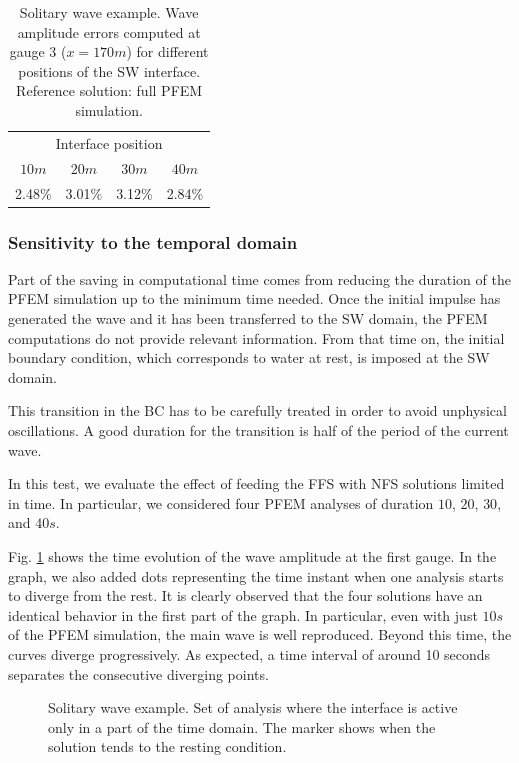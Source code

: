 \begin{table} [htb]
    \centering
    \begin{tabular}{cccc}
        \hline
\multicolumn{4}{c}{Interface position}  \\ \cline{1-4}
$10m$    & $20m$    & $30m$   & $40m$   \\ \hline
2.48\%   & 3.01\%   & 3.12\%  & 2.84\%  \\ \hline
    \end{tabular}
    \caption{Solitary wave example. Wave amplitude errors computed at gauge 3 ($x=170m$) for different positions of the SW interface. Reference solution: full PFEM simulation.}
    \label{solitary_wave_BC_errors_interface}
\end{table}


\subsubsection{Sensitivity to the temporal domain}
Part of the saving in computational time comes from reducing the duration of the PFEM simulation up to the minimum time needed. 
Once the initial impulse has generated the wave and it has been transferred to the SW domain, the PFEM computations do not provide relevant information. From that time on, the initial boundary condition, which corresponds to water at rest, is imposed at the SW domain.  

This transition in the BC has to be carefully treated in order to avoid unphysical oscillations. A good duration for the transition is half of the period of the current wave.

In this test, we evaluate the effect of feeding the FFS with NFS solutions limited in time. In particular, we considered four PFEM analyses of duration $10$, $20$, $30$, and $40s$.

Fig. \ref{solitary_wave_time_convergence} shows the time evolution of the wave amplitude at the first gauge. In the graph, we also added dots representing the time instant when one analysis starts to diverge from the rest. It is clearly observed that the four solutions have an identical behavior in the first part of the graph. In particular, even with just $10s$ of the PFEM simulation, the main wave is well reproduced. Beyond this time, the curves diverge progressively. As expected, a time interval of around 10 seconds separates the consecutive diverging points.

\begin{figure} [htb]
    \centering
    \caption{Solitary wave example. Set of analysis where the interface is active only in a part of the time domain. The marker shows when the solution tends to the resting condition.}
    \label{solitary_wave_time_convergence}
\end{figure}




